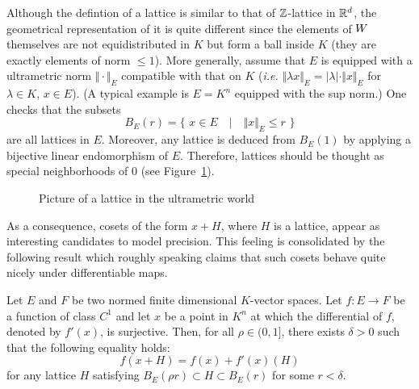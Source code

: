 \documentclass{article}
\begin{document}
Although the defintion of a lattice is similar to that of $\mathbb Z$-lattice 
in $\mathbb R^d$, the geometrical representation of it is quite different since 
the elements of $W$ themselves are not equidistributed in $K$ but form 
a ball inside $K$ (they are exactly elements of norm $\leq 1$). More 
generally, assume that $E$ is equipped with a ultrametric norm $\Vert 
\cdot \Vert_E$ compatible with that on $K$ (\emph{i.e.} $\Vert \lambda x 
\Vert_E = |\lambda| \cdot \Vert x \Vert_E$ for $\lambda \in K$, $x \in 
E$). (A typical example is $E = K^n$ equipped with the sup norm.) One
checks that the subsets
$$B_E(r) = \big\{ \,\, x \in E \quad|\quad \Vert x \Vert_E \leq r \,\,\big\}$$
are all lattices in $E$. Moreover, any lattice is deduced from $B_E(1)$ 
by applying a bijective linear endomorphism of $E$. Therefore, lattices 
should be thought as special neighborhoods of $0$ (see Figure~\ref{fig:lattice}).
%
\begin{figure}
\hfill
{}
\hfill \null

\caption{Picture of a lattice in the ultrametric world}
\label{fig:lattice}
\end{figure}
%
As a consequence, cosets of the form $x + H$, where $H$ is a lattice, 
appear as interesting candidates to model precision. This feeling is 
consolidated by the following result which roughly speaking claims that 
such cosets behave quite nicely under differentiable maps.

\begin{lem}
\label{lem:padicprec}
Let $E$ and $F$ be two normed finite dimensional $K$-vector spaces.
Let $f : E \to F$ be a function of class $C^1$ and let $x$
be a point in $K^n$ at which the differential of $f$, denoted by
$f'(x)$, is surjective.
Then, for all $\rho \in (0,1]$, there exists $\delta > 0$ such that
the following equality holds:
\begin{equation}
\label{eq:padicprec}
f(x + H) = f(x) + f'(x)(H)
\end{equation}
for any lattice $H$ satisfying $B_E(\rho r) \subset H \subset B_E(r)$
for some $r < \delta$.
\end{lem}
\end{document}
